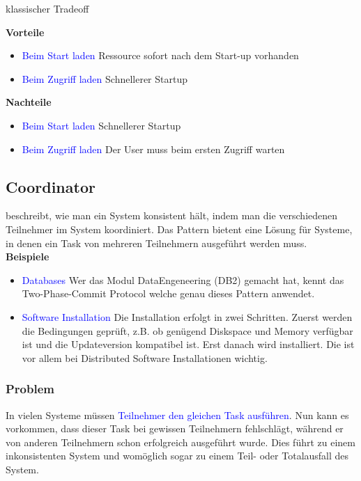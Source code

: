 klassischer Tradeoff

\textbf{Vorteile}

\begin{itemize}
    \item \textcolor{blue}{Beim Start laden} Ressource sofort nach dem Start-up vorhanden
    \item \textcolor{blue}{Beim Zugriff laden} Schnellerer Startup
\end{itemize}
\vspace{10pt}
\textbf{Nachteile}

\begin{itemize}
    \item \textcolor{blue}{Beim Start laden} Schnellerer Startup
    \item \textcolor{blue}{Beim Zugriff laden} Der User muss beim ersten Zugriff warten
\end{itemize}

\subsection{Coordinator}

beschreibt, wie man ein System konsistent hält, indem man die verschiedenen Teilnehmer im System koordiniert. Das Pattern bietent eine Lösung für Systeme, in denen ein Task von mehreren Teilnehmern ausgeführt werden muss. \\

\textbf{Beispiele}

\begin{itemize}
    \item \textcolor{blue}{Databases} Wer das Modul DataEngeneering (DB2) gemacht hat, kennt das Two-Phase-Commit Protocol welche genau dieses Pattern anwendet.
    \item \textcolor{blue}{Software Installation} Die Installation erfolgt in zwei Schritten. Zuerst werden die Bedingungen geprüft, z.B. ob genügend Diskspace und Memory verfügbar ist und die Updateversion kompatibel ist. Erst danach wird installiert. Die ist vor allem bei Distributed Software Installationen wichtig.
\end{itemize}


\subsubsection{Problem}

In vielen Systeme müssen \textcolor{blue}{Teilnehmer den gleichen Task ausführen}. Nun kann es vorkommen, dass dieser Task bei gewissen Teilnehmern fehlschlägt, während er von anderen Teilnehmern schon erfolgreich ausgeführt wurde. Dies führt zu einem inkonsistenten System und womöglich sogar zu einem Teil- oder Totalausfall des System.

